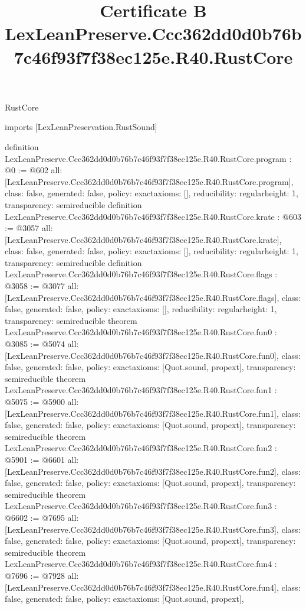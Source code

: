 \begin{lexlean}{RustCore}
\title{Certificate B LexLeanPreserve.Ccc362dd0d0b76b7c46f93f7f38ec125e.R40.RustCore}
\begin{coremodule}
imports [LexLeanPreservation.RustSound]

definition LexLeanPreserve.Ccc362dd0d0b76b7c46f93f7f38ec125e.R40.RustCore.program : @0 := @602 {
  all: [LexLeanPreserve.Ccc362dd0d0b76b7c46f93f7f38ec125e.R40.RustCore.program],
  class: false,
  generated: false,
  policy: exact{axioms: []},
  reducibility: regular{height: 1},
  transparency: semireducible
}
definition LexLeanPreserve.Ccc362dd0d0b76b7c46f93f7f38ec125e.R40.RustCore.krate : @603 := @3057 {
  all: [LexLeanPreserve.Ccc362dd0d0b76b7c46f93f7f38ec125e.R40.RustCore.krate],
  class: false,
  generated: false,
  policy: exact{axioms: []},
  reducibility: regular{height: 1},
  transparency: semireducible
}
definition LexLeanPreserve.Ccc362dd0d0b76b7c46f93f7f38ec125e.R40.RustCore.flags : @3058 := @3077 {
  all: [LexLeanPreserve.Ccc362dd0d0b76b7c46f93f7f38ec125e.R40.RustCore.flags],
  class: false,
  generated: false,
  policy: exact{axioms: []},
  reducibility: regular{height: 1},
  transparency: semireducible
}
theorem LexLeanPreserve.Ccc362dd0d0b76b7c46f93f7f38ec125e.R40.RustCore.fun0 : @3085 := @5074 {
  all: [LexLeanPreserve.Ccc362dd0d0b76b7c46f93f7f38ec125e.R40.RustCore.fun0],
  class: false,
  generated: false,
  policy: exact{axioms: [Quot.sound, propext]},
  transparency: semireducible
}
theorem LexLeanPreserve.Ccc362dd0d0b76b7c46f93f7f38ec125e.R40.RustCore.fun1 : @5075 := @5900 {
  all: [LexLeanPreserve.Ccc362dd0d0b76b7c46f93f7f38ec125e.R40.RustCore.fun1],
  class: false,
  generated: false,
  policy: exact{axioms: [Quot.sound, propext]},
  transparency: semireducible
}
theorem LexLeanPreserve.Ccc362dd0d0b76b7c46f93f7f38ec125e.R40.RustCore.fun2 : @5901 := @6601 {
  all: [LexLeanPreserve.Ccc362dd0d0b76b7c46f93f7f38ec125e.R40.RustCore.fun2],
  class: false,
  generated: false,
  policy: exact{axioms: [Quot.sound, propext]},
  transparency: semireducible
}
theorem LexLeanPreserve.Ccc362dd0d0b76b7c46f93f7f38ec125e.R40.RustCore.fun3 : @6602 := @7695 {
  all: [LexLeanPreserve.Ccc362dd0d0b76b7c46f93f7f38ec125e.R40.RustCore.fun3],
  class: false,
  generated: false,
  policy: exact{axioms: [Quot.sound, propext]},
  transparency: semireducible
}
theorem LexLeanPreserve.Ccc362dd0d0b76b7c46f93f7f38ec125e.R40.RustCore.fun4 : @7696 := @7928 {
  all: [LexLeanPreserve.Ccc362dd0d0b76b7c46f93f7f38ec125e.R40.RustCore.fun4],
  class: false,
  generated: false,
  policy: exact{axioms: [Quot.sound, propext]},
}
\end{coremodule}
\end{lexlean}

